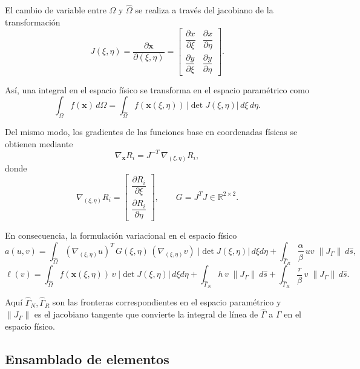 \documentclass[12pt]{article}
\begin{document}
\medskip

El cambio de variable entre $\Omega$ y $\hat{\Omega}$ se realiza a través del 
jacobiano de la transformación
\[
J(\xi,\eta) = \frac{\partial \mathbf{x}}{\partial (\xi,\eta)} 
= 
\begin{bmatrix}
\dfrac{\partial x}{\partial \xi} & \dfrac{\partial x}{\partial \eta} \\[8pt]
\dfrac{\partial y}{\partial \xi} & \dfrac{\partial y}{\partial \eta}
\end{bmatrix}.
\]

\medskip

Así, una integral en el espacio físico se transforma en el espacio paramétrico como
\[
\int_{\Omega} f(\mathbf{x}) \, d\Omega 
= \int_{\hat{\Omega}} f(\mathbf{x}(\xi,\eta)) \, \big|\det J(\xi,\eta)\big| \, d\xi \, d\eta.
\]

\medskip

Del mismo modo, los gradientes de las funciones base en coordenadas físicas se obtienen mediante
\[
\nabla_{\mathbf{x}} R_i = J^{-T} \, \nabla_{(\xi,\eta)} R_i,
\]
donde 
\[
\nabla_{(\xi,\eta)} R_i =
\begin{bmatrix}
\dfrac{\partial R_i}{\partial \xi} \\[6pt]
\dfrac{\partial R_i}{\partial \eta}
\end{bmatrix},
\qquad 
G = J^T J \in \mathbb{R}^{2\times 2}.
\]


\medskip

En consecuencia, la formulación variacional en el espacio físico
\[
a(u,v) = \int_{\hat{\Omega}} (\nabla_{(\xi,\eta)} u)^T \, G(\xi,\eta) \, (\nabla_{(\xi,\eta)} v) \; |\det J(\xi,\eta)| \, d\xi d\eta
          + \int_{\hat{\Gamma}_R} \frac{\alpha}{\beta}\, u v \; \|J_\Gamma\| \, d\hat s,
\]
\[
\ell(v) = \int_{\hat{\Omega}} f(\mathbf{x}(\xi,\eta))\, v \; |\det J(\xi,\eta)| \, d\xi d\eta
          + \int_{\hat{\Gamma}_N} h \, v \; \|J_\Gamma\| \, d\hat s
          + \int_{\hat{\Gamma}_R} \frac{r}{\beta}\, v \; \|J_\Gamma\| \, d\hat s.
\]

Aquí \(\hat{\Gamma}_N, \hat{\Gamma}_R\) son las fronteras correspondientes en el espacio paramétrico y
\(\|J_\Gamma\|\) es el jacobiano tangente que convierte la integral de línea de \(\hat{\Gamma}\) a \(\Gamma\) en el espacio físico.

\subsection{Ensamblado de elementos}
\end{document}
